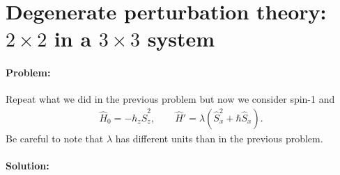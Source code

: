 \documentclass[10pt]{article}
\newcommand{\1}{\mathbf 1}
\begin{document}


\newpage






\section*{Degenerate perturbation theory: $2 \times 2$ in a $3 \times 3$ system}

\paragraph{Problem:}

Repeat what we did in the previous problem but now we consider spin-1 and
\begin{align}
	\hat H_0 = - h_z \hat S_z^2,
	\qquad 
	\hat H' = \lambda (\hat S_x^2 +\hbar \hat S_x).
\end{align}
Be careful to note that $\lambda$ has different units than in the previous problem.

\paragraph{Solution:}
\end{document}
